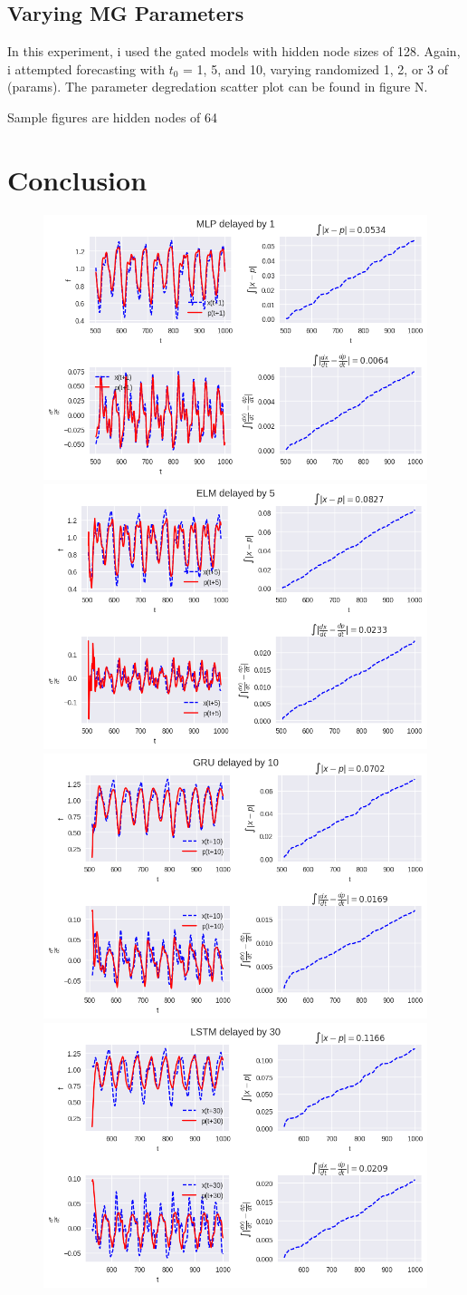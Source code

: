 \documentclass[11pt]{article}
\begin{document}
 \subsection {Varying MG Parameters}
 In this experiment, i used the gated models with hidden node sizes
 of 128. Again, i attempted forecasting with $t_0$ = 1, 5, and 10,
 varying randomized 1, 2, or 3 of (params). The parameter degredation
 scatter plot can be found in figure N.

 Sample figures are hidden nodes of 64
 \section{Conclusion}

  
 \begin{figure}
   \begin{center}
   \includegraphics[width=.48\textwidth]{figures/MLP_1.png}
   \includegraphics[width=.48\textwidth]{figures/ELM_5.png}
   \includegraphics[width=.48\textwidth]{figures/GRU_10.png}
   \includegraphics[width=.48\textwidth]{figures/LSTM_30.png}

\end{center}
\end{figure}
\end{document}
